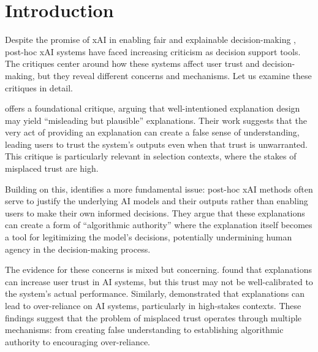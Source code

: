 
\section{Introduction}
Despite the promise of xAI in enabling fair and explainable decision-making \cite{Goodman_Flaxman_2017}, post-hoc xAI systems have faced increasing criticism as decision support tools. The critiques center around how these systems affect user trust and decision-making, but they reveal different concerns and mechanisms. Let us examine these critiques in detail.

\textcite{Lipton} offers a foundational critique, arguing that well-intentioned explanation design may yield ``misleading but plausible'' explanations. Their work suggests that the very act of providing an explanation can create a false sense of understanding, leading users to trust the system's outputs even when that trust is unwarranted. This critique is particularly relevant in selection contexts, where the stakes of misplaced trust are high.

Building on this, \textcite{miller_explainable_2023} identifies a more fundamental issue: post-hoc xAI methods often serve to justify the underlying AI models and their outputs rather than enabling users to make their own informed decisions. They argue that these explanations can create a form of ``algorithmic authority'' where the explanation itself becomes a tool for legitimizing the model's decisions, potentially undermining human agency in the decision-making process.

The evidence for these concerns is mixed but concerning. \textcite{lai_human_2019} found that explanations can increase user trust in AI systems, but this trust may not be well-calibrated to the system's actual performance. Similarly, \textcite{jacobs_how_2021} demonstrated that explanations can lead to over-reliance on AI systems, particularly in high-stakes contexts. These findings suggest that the problem of misplaced trust operates through multiple mechanisms: from creating false understanding to establishing algorithmic authority to encouraging over-reliance.

